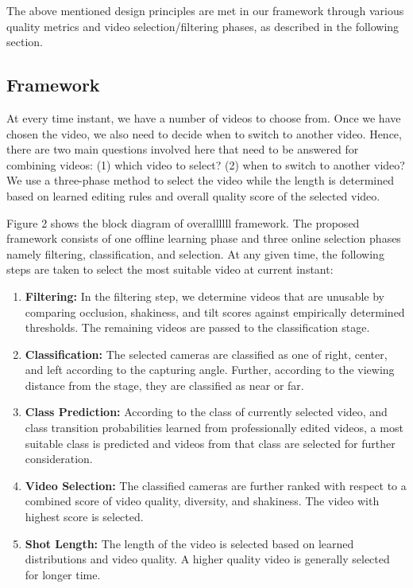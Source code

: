 \documentclass{sig-alternate-05-2015}
\begin{document}
The above mentioned design principles are met in our framework
through various quality metrics and video selection/filtering phases,
as described in the following section.

\subsection{Framework}

At every time instant, we have a number of videos to choose
from. Once we have chosen the video, we also need to decide when
to switch to another video. Hence, there are two main questions
involved here that need to be answered for combining videos: (1)
which video to select? (2) when to switch to another video? We
use a three-phase method to select the video while the length is
determined based on learned editing rules and overall quality score
of the selected video.

Figure 2 shows the block diagram of overallllll framework. The
proposed framework consists of one offline learning phase and three online selection phases namely filtering, classification, and selection.
At any given time, the following steps are taken to select the
most suitable video at current instant:

\begin{enumerate}
\item \textbf{Filtering:}
In the filtering step, we determine videos that are
unusable by comparing occlusion, shakiness, and tilt scores
against empirically determined thresholds. The remaining
videos are passed to the classification stage.
\item \textbf{Classification:}
The selected cameras are classified as one
of right, center, and left according to the capturing angle.
Further, according to the viewing distance from the stage,
they are classified as near or far.
\item \textbf{Class Prediction:}
According to the class of currently selected
video, and class transition probabilities learned from
professionally edited videos, a most suitable class is predicted
and videos from that class are selected for further consideration.
\item \textbf{Video Selection:}
The classified cameras are further ranked
with respect to a combined score of video quality, diversity,
and shakiness. The video with highest score is selected.
\item \textbf{Shot Length:}
The length of the video is selected based on
learned distributions and video quality. A higher quality video
is generally selected for longer time.
\end{enumerate}
\end{document}
